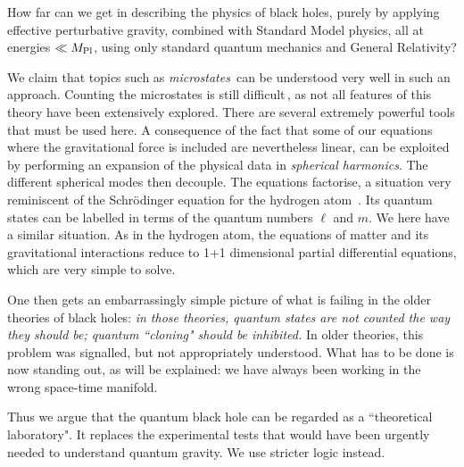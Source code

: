 \documentclass[12pt]{article}
\begin{document}
How far can we get in describing the physics of black holes, purely by applying effective perturbative gravity, combined with Standard Model physics, all at energies \(\ll M_{\mathrm{Pl}}\), using only standard quantum mechanics and General Relativity?

We claim that topics such as \emph{microstates}\,\cite{Bek1, Bek2} can be understood very well in such an approach. Counting the microstates is still difficult\,\cite{GtHmicro}, as not all features of this theory have been extensively explored. There are several extremely powerful tools that must be used here. A consequence of the fact that some of our equations where the gravitational force is included are nevertheless linear, can be exploited by performing an expansion of the physical data in \emph{spherical harmonics}. The different spherical modes then decouple. The equations factorise, a situation very reminiscent of the Schr\"odinger equation for the hydrogen atom\ \cite{GtHdiagonal}. Its quantum states can be labelled in terms of the quantum numbers \(\ell\) and \(m\). We here have a similar situation. As in the hydrogen atom, the equations of matter and its gravitational interactions reduce to 1+1 dimensional partial differential equations, which are very simple to solve.

One then gets an embarrassingly simple picture of what is failing in the older theories of black holes: \emph{in those theories, quantum states are not counted the way they should be; quantum ``cloning" should be inhibited.} In older theories, this problem was signalled, but not appropriately understood. What has to be done is now standing out, as will be explained: we have always been working in the wrong space-time manifold.

Thus we argue that the quantum black hole can be regarded as a ``theoretical laboratory". It replaces the experimental tests that would have been urgently needed to understand quantum gravity. We use stricter logic instead.
							
\end{document}
